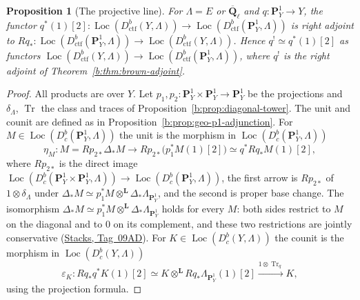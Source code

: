 \documentclass[11pt,a4paper]{article}
\numberwithin{equation}{section}
\newtheorem{proposition}[theorem]{Proposition}
\theoremstyle{definition}
\theoremstyle{remark}
\newcommand{\Dbc}{D^b_c}
\newcommand{\Loc}{\operatorname{Loc}}
\newcommand{\Qbar}{\overline{\mathbf Q}_\ell}
\newcommand{\stacks}[1]{\href{https://stacks.math.columbia.edu/tag/#1}{\textnormal{Stacks, Tag~#1}}}
\newcommand{\Dctf}{D^b_{\mathrm{ctf}}}
\begin{document}
\begin{proposition}[The projective line]
\label{b:prop:p1-adjunction-rational}
For $\Lambda=E$ or $\Qbar$ and $q:\mathbf P^1_Y\to Y$, the functor
$q^*(1)[2]\colon\Loc(\Dctf(Y,\Lambda))\to\Loc(\Dctf(\mathbf P^1_Y,\Lambda))$
is right adjoint to
$Rq_*:\Loc(\Dctf(\mathbf P^1_Y,\Lambda))\to\Loc(\Dctf(Y,\Lambda))$. Hence
$q^!\simeq q^*(1)[2]$ as functors
$\Loc(\Dctf(Y,\Lambda))\to\Loc(\Dctf(\mathbf P^1_Y,\Lambda))$, where $q^!$
is the right adjoint of Theorem~\ref{b:thm:brown-adjoint}.
\end{proposition}
\begin{proof}
All products are over $Y$. Let $p_1,p_2:\mathbf P^1_Y\times\mathbf P^1_Y\to\mathbf P^1_Y$
be the projections and $\delta_\Lambda$, $\operatorname{Tr}$ the class
and traces of Proposition~\ref{b:prop:diagonal-tower}. The unit and
counit are defined as in Proposition~\ref{b:prop:geo-p1-adjunction}.
For $M\in \Loc(\Dbc(\mathbf P^1_Y,\Lambda))$ the unit is the morphism in
$\Loc(\Dbc(\mathbf P^1_Y,\Lambda))$
\[
 \eta_M:M=Rp_{2*}\Delta_*M
 \longrightarrow Rp_{2*}\bigl(p_1^*M(1)[2]\bigr)
 \simeq q^*Rq_*M(1)[2],
\]
where $Rp_{2*}$ is the direct image
$\Loc(\Dbc(\mathbf P^1_Y\times\mathbf P^1_Y,\Lambda))\to\Loc(\Dbc(\mathbf P^1_Y,\Lambda))$,
the first arrow is $Rp_{2*}$ of $1\otimes\delta_\Lambda$ under
$\Delta_*M\simeq p_1^*M\otimes^{\mathbf L}\Delta_*\Lambda_{\mathbf P^1_Y}$,
and the second is proper base change. The isomorphism
$\Delta_*M\simeq p_1^*M\otimes^{\mathbf L}\Delta_*\Lambda_{\mathbf P^1_Y}$
holds for every $M$: both sides restrict to $M$ on the diagonal and to
$0$ on its complement, and these two restrictions are jointly
conservative (\stacks{09AD}). For $K\in \Loc(\Dbc(Y,\Lambda))$ the counit
is the morphism in $\Loc(\Dbc(Y,\Lambda))$
\[
 \varepsilon_K:Rq_*q^*K(1)[2]
 \simeq K\otimes^{\mathbf L}Rq_*\Lambda_{\mathbf P^1_Y}(1)[2]
 \xrightarrow{1\otimes \operatorname{Tr}_q}K,
\]
using the projection formula.


\end{proof}
\end{document}
